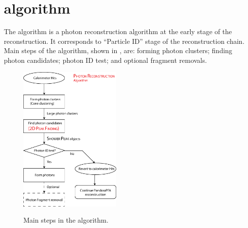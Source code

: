 



\section{\PhotonReconstruction algorithm}
\label{sec:photonRecostrcution}


The \PhotonReconstruction algorithm is a photon reconstruction  algorithm at the early stage of the reconstruction. It corresponds to ``Particle ID'' stage of the \pandora reconstruction chain.  Main steps of the \PhotonReconstruction algorithm, shown in , are:  forming photon clusters; finding photon candidates; photon ID test; and optional fragment removals.


\begin{figure}[tbph]
\centering
{\includegraphics[width=0.45\textwidth]{photon/photonRecoFlow2}}
\caption[A flow diagram of the \PhotonReconstruction algorithm.]
{Main steps in the \PhotonReconstruction algorithm.}
\label{fig:photonPhotonRecoFlow}
\end{figure}


